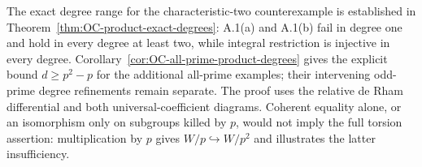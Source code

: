 \begin{remark}
\label{rem:OC-integral-degree-gate}
The exact degree range for the characteristic-two counterexample is established in Theorem~\ref{thm:OC-product-exact-degrees}: A.1(a) and A.1(b) fail in degree one and hold in every degree at least two, while integral restriction is injective in every degree.  Corollary~\ref{cor:OC-all-prime-product-degrees} gives the explicit bound $d\geq p^2-p$ for the additional all-prime examples; their intervening odd-prime degree refinements remain separate.  The proof uses the relative de Rham differential and both universal-coefficient diagrams.  Coherent equality alone, or an isomorphism only on subgroups killed by $p$, would not imply the full torsion assertion: multiplication by $p$ gives $W/p\hookrightarrow W/p^2$ and illustrates the latter insufficiency.
\end{remark}

